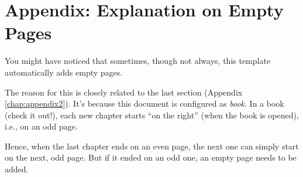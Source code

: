 \chapter{Appendix: Explanation on Empty Pages}\label{chap:appendix3}

You might have noticed that sometimes, though not always, this template automatically adds empty pages. 

The reason for this is closely related to the last section (Appendix \ref{chap:appendix2}). It's because this document is configured as \emph{book}. In a book (check it out!), each new chapter starts ``on the right'' (when the book is opened), i.e., on an odd page. 

Hence, when the last chapter ends on an even page, the next one can simply start on the next, odd page. But if it ended on an odd one, an empty page needs to be added.